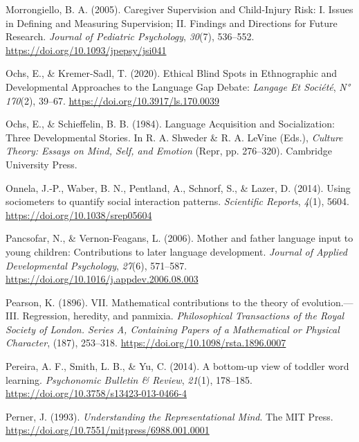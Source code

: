 \documentclass[
  english,
  12pt,
  man,floatsintext]{apa6}
\newlength{\cslhangindent}
\newenvironment{CSLReferences}[2] %
 {\begin{list}{}{%
  \setlength{\itemindent}{0pt}
  \setlength{\leftmargin}{0pt}
  \setlength{\parsep}{0pt}
  \ifodd #1
   \setlength{\leftmargin}{\cslhangindent}
   \setlength{\itemindent}{-1\cslhangindent}
  \fi
  \setlength{\itemsep}{#2\baselineskip}}}
 {\end{list}}
\begin{document}
\begin{CSLReferences}{1}{0}
Morrongiello, B. A. (2005). Caregiver {Supervision} and {Child-Injury Risk}: {I}. {Issues} in {Defining} and {Measuring Supervision}; {II}. {Findings} and {Directions} for {Future Research}. \emph{Journal of Pediatric Psychology}, \emph{30}(7), 536--552. \url{https://doi.org/10.1093/jpepsy/jsi041}

Ochs, E., \& Kremer-Sadl, T. (2020). Ethical {Blind Spots} in {Ethnographic} and {Developmental Approaches} to the {Language Gap Debate}: \emph{Langage Et Société}, \emph{N° 170}(2), 39--67. \url{https://doi.org/10.3917/ls.170.0039}

Ochs, E., \& Schieffelin, B. B. (1984). Language {Acquisition} and {Socialization}: {Three Developmental Stories}. In R. A. Shweder \& R. A. LeVine (Eds.), \emph{Culture {Theory}: {Essays} on {Mind}, {Self}, and {Emotion}} (Repr, pp. 276--320). Cambridge University Press.

Onnela, J.-P., Waber, B. N., Pentland, A., Schnorf, S., \& Lazer, D. (2014). Using sociometers to quantify social interaction patterns. \emph{Scientific Reports}, \emph{4}(1), 5604. \url{https://doi.org/10.1038/srep05604}

Pancsofar, N., \& Vernon-Feagans, L. (2006). Mother and father language input to young children: {Contributions} to later language development. \emph{Journal of Applied Developmental Psychology}, \emph{27}(6), 571--587. \url{https://doi.org/10.1016/j.appdev.2006.08.003}

Pearson, K. (1896). {VII}. {Mathematical} contributions to the theory of evolution.---{III}. {Regression}, heredity, and panmixia. \emph{Philosophical Transactions of the Royal Society of London. Series A, Containing Papers of a Mathematical or Physical Character}, (187), 253--318. \url{https://doi.org/10.1098/rsta.1896.0007}

Pereira, A. F., Smith, L. B., \& Yu, C. (2014). A bottom-up view of toddler word learning. \emph{Psychonomic Bulletin \& Review}, \emph{21}(1), 178--185. \url{https://doi.org/10.3758/s13423-013-0466-4}

Perner, J. (1993). \emph{Understanding the {Representational Mind}}. The MIT Press. \url{https://doi.org/10.7551/mitpress/6988.001.0001}


\end{CSLReferences}
\end{document}
